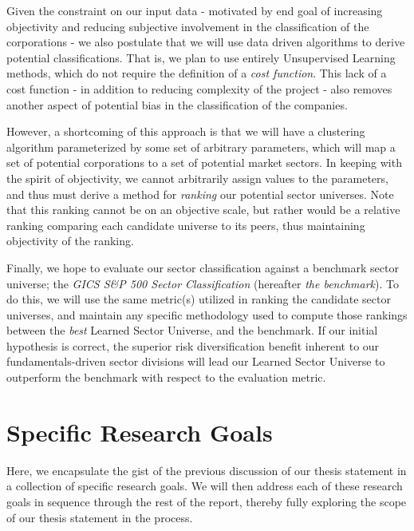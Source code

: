 \documentclass[../main.tex]{subfiles}
\begin{document}
Given the constraint on our input data - motivated by end goal of increasing objectivity and reducing subjective involvement in the classification of the corporations - we also postulate that we will use data driven algorithms to derive potential classifications. That is, we plan to use entirely Unsupervised Learning methods, which do not require the definition of a \textit{cost function}. This lack of a cost function - in addition to reducing complexity of the project - also removes another aspect of potential bias in the classification of the companies.

However, a shortcoming of this approach is that we will have a clustering algorithm parameterized by some set of arbitrary parameters, which will map a set of potential corporations to a set of potential market sectors. In keeping with the spirit of objectivity, we cannot arbitrarily assign values to the parameters, and thus must derive a method for \textit{ranking} our potential sector universes. Note that this ranking cannot be on an objective scale, but rather would be a relative ranking comparing each candidate universe to its peers, thus maintaining objectivity of the ranking.

Finally, we hope to evaluate our sector classification against a benchmark sector universe; the \textit{GICS S\&P 500 Sector Classification} (hereafter \textit{the benchmark}). To do this, we will use the same metric(s) utilized in ranking the candidate sector universes, and maintain any specific methodology used to compute those rankings between the \textit{best} Learned Sector Universe, and the benchmark. If our initial hypothesis is correct, the superior risk diversification benefit inherent to our fundamentals-driven sector divisions will lead our Learned Sector Universe to outperform the benchmark with respect to the evaluation metric.

\pagebreak

\section{Specific Research Goals} \label{research_goals:specific_research_goals}

Here, we encapsulate the gist of the previous discussion of our thesis statement in a collection of specific research goals. We will then address each of these research goals in sequence through the rest of the report, thereby fully exploring the scope of our thesis statement in the process.

\vspace{2em}
\end{document}
